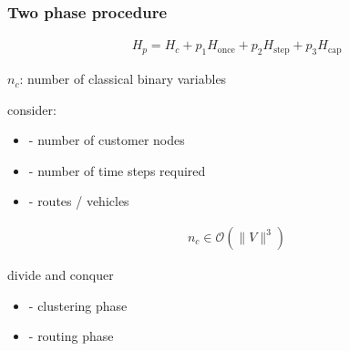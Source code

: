 \documentclass {beamer}
\newcommand {\qnorm}[1] {\lVert #1 \rVert}
\begin{document}
\begin {frame}
\frametitle {Two phase procedure}

\begin {align*}
H_p = H_c + p_1 H_{\text{once}} + p_2 H_{\text{step}} + p_3 H_{\text{cap}}
\end {align*}

\pause
$n_c$: number of classical binary variables

\vspace {0.3cm}

\pause
consider:
\begin {itemize}
\item[-]	number of customer nodes 
\item[-]	number of time steps required
\item[-]	routes / vehicles
\end {itemize}

\pause
\begin {align*}
n_c \in \mathcal{O}(\qnorm{V}^3)
\end {align*}

\pause
divide and conquer \cite{cvrpanneal} \cite{cvrpqaoa}
\begin {itemize}
\item[-]	clustering phase
\item[-]	routing phase
\end {itemize}

\end {frame}
\end{document}
